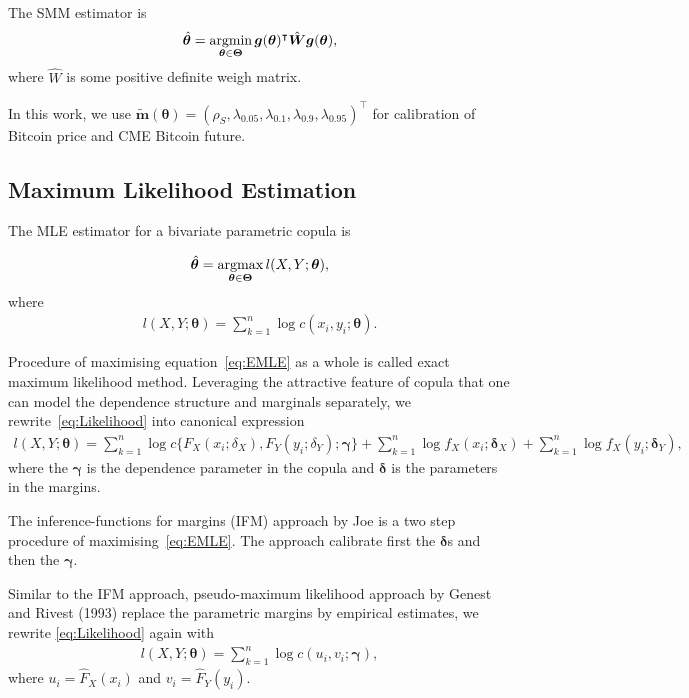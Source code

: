 The SMM estimator is
\begin{align*}
    \hat{\bm{\theta}} = \argmin_{\bm{\theta}\in \bm{\Theta}} \bm{g}(\bm{\theta})^\intercal
    \hat{\bm{W}}
     \bm{g}(\bm{\theta}),
\end{align*}
where $\hat{W}$ is some positive definite weigh matrix.

In this work, we use $\tilde{\bm{m}}(\bm{\theta}) = (\rho_S, \lambda_{0.05}, \lambda_{0.1},
\lambda_{0.9}, \lambda_{0.95})^\intercal$
for calibration of Bitcoin price and CME Bitcoin future.


\subsection{Maximum Likelihood Estimation}
The MLE estimator for a bivariate parametric copula is

\begin{align}
    \hat{\bm{\theta}} = \argmax_{\bm{\theta} \in \bm{\Theta}} l(X,Y; \bm{\theta}), \label{eq:EMLE}
    \end{align}
where
\begin{align}
    l(X,Y; \bm{\theta}) = \sum_{k=1}^n \log c(x_i, y_i;\bm{\theta}). \label{eq:Likelihood}
    \end{align}

Procedure of maximising equation~\ref{eq:EMLE} as a whole is called exact maximum likelihood method.
Leveraging the attractive feature of copula that one can model the dependence structure and marginals separately,
we rewrite~\ref{eq:Likelihood} into canonical expression
\begin{align}
    l(X,Y; \bm{\theta}) = \sum_{k=1}^n \log c\{F_X(x_i; \delta_X), F_Y(y_i; \delta_Y); \bm{\gamma}\}
    + \sum_{k=1}^n \log f_X(x_i; \bm{\delta}_X) + \sum_{k=1}^n \log f_X(y_i; \bm{\delta}_Y),
    \end{align}
where the $\bm{\gamma}$ is the dependence parameter in the copula and $\bm{\delta}$ is the parameters in the margins.

The inference-functions for margins (IFM) approach by Joe is a two step procedure of maximising~\ref{eq:EMLE}.
The approach calibrate first the $\bm{\delta}$s and then the  $\bm{\gamma}$.

Similar to the IFM approach, pseudo-maximum likelihood approach by Genest and Rivest (1993) replace the parametric margins by
empirical estimates, we rewrite \ref{eq:Likelihood} again with
\begin{align}
    l(X,Y; \bm{\theta}) = \sum_{k=1}^n \log c(u_i, v_i;\bm{\gamma}),
    \end{align}
where $u_i = \hat{F}_X(x_i)$ and $v_i = \hat{F}_Y(y_i)$.

